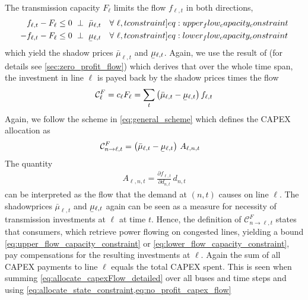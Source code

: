 \documentclass[11pt,twocolumn]{article}
\newcommand{\ubar}[1]{\underaccent{\bar}{#1}}
\newcommand{\resultsin}[1]{\hspace{6pt} \bot  \hspace{6pt} #1}
\newcommand{\Forall}[1]{\hspace{10pt} \forall \,\, #1 }
\newcommand{\pdv}[2]{\frac{\partial #1}{\partial #2}}
\newcommand{\flow}{f_{\ell,t}}
\newcommand{\capacityflow}{F_{\ell}}
\newcommand{\capitalpriceflow}{c_{\ell}}
\newcommand{\mulowerflow}{\ubar{\mu}_{\ell,t}}
\newcommand{\muupperflow}{\bar{\mu}_{\ell,t}}
\newcommand{\demand}[1][n]{d_{#1,t}}
\newcommand{\allocateflow}[1][n]{A_{\ell,#1,t}}
\newcommand{\allocatecapexflow}[1][n]{\mathcal{C}^{F}_{#1,t}}
\newcommand{\capexflow}{\mathcal{C}^F}
\begin{document}
The transmission capacity $\capacityflow$ limits the flow $\flow$ in both directions,
\begin{align}
\flow - \capacityflow &\le 0 \resultsin{\muupperflow} \Forall{\ell,t} 
\label[constraint]{eq:upper_flow_capacity_constraint} \\
- \flow - \capacityflow &\le 0 \resultsin{\mulowerflow} \Forall{\ell,t} 
\label[constraint]{eq:lower_flow_capacity_constraint}
\end{align}
which yield the shadow prices $\muupperflow$ and $\mulowerflow$. Again, we use the result of \cite{brown_decreasing_2020} (for details see \cref{sec:zero_profit_flow}) which derives that over the whole time span, the investment in line $\ell$ is payed back by the shadow prices times the flow 
\begin{align}
\capexflow_\ell = \capitalpriceflow \capacityflow = \sum_{t} \left( \muupperflow - \mulowerflow \right)  \flow 
\label{eq:no_profit_capex_flow}
\end{align}
Again, we follow the scheme in \cref{eq:general_scheme} which  defines the CAPEX allocation as 
\begin{align}
    \allocatecapexflow[n \rightarrow \ell] &=  
   \left( \muupperflow - \mulowerflow\right) \, \allocateflow
   \label{eq:allocate_capexFlow_detailed}
\end{align}
The quantity 
\begin{align}
 \allocateflow =  \pdv{\flow}{\demand}\, \demand
\end{align}
can be interpreted as the flow that the demand at $\left(n,t\right)$ causes on line $\ell$.
The  shadowprices $\muupperflow$ and $\mulowerflow$ again can be seen as a measure for necessity of transmission investments at $\ell$ at time $t$. Hence, the definition of $\allocatecapexflow[n \rightarrow \ell]$ states that consumers, which retrieve power flowing on congested lines, yielding a bound \cref{eq:upper_flow_capacity_constraint} or \eqref{eq:lower_flow_capacity_constraint}, pay compensations for the resulting investments at $\ell$. Again the sum of all CAPEX payments to line $\ell$ equals the total CAPEX spent. This is seen when summing \cref{eq:allocate_capexFlow_detailed} over all buses and time steps and using \cref{eq:allocate_state_constraint,eq:no_profit_capex_flow}
\end{document}
